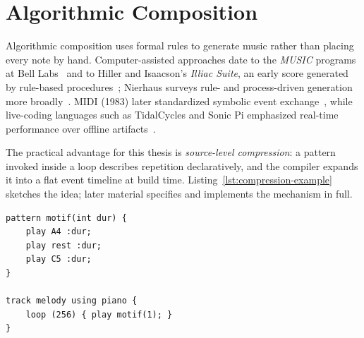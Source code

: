 \section{Algorithmic Composition}\label{sec:algorithmic-composition}

Algorithmic composition uses formal rules to generate music rather than placing every note by hand.
Computer-assisted approaches date to the \textit{MUSIC} programs at Bell Labs~\cite{Roads_1996} and to Hiller and
Isaacson's \textit{Illiac Suite}, an early score generated by rule-based procedures~\cite{Hiller_Isaacson_1959};
Nierhaus surveys rule- and process-driven generation more broadly~\cite{Nierhaus_2009}.
MIDI (1983) later standardized symbolic event exchange~\cite{Moog_1986}, while live-coding languages such as
TidalCycles and Sonic Pi emphasized real-time performance over offline artifacts~\cite{McLean_Wiggins_2010,Aaron_2016}.

The practical advantage for this thesis is \textit{source-level compression}: a pattern invoked inside a loop
describes repetition declaratively, and the compiler expands it into a flat event timeline at build time.
Listing~\ref{lst:compression-example} sketches the idea; later material specifies and implements the mechanism in full.

\begin{lstlisting}[language={Motivo},label={lst:compression-example},caption={Compact source that lowering expands into many MIDI events.}]
pattern motif(int dur) {
    play A4 :dur;
    play rest :dur;
    play C5 :dur;
}

track melody using piano {
    loop (256) { play motif(1); }
}
\end{lstlisting}
